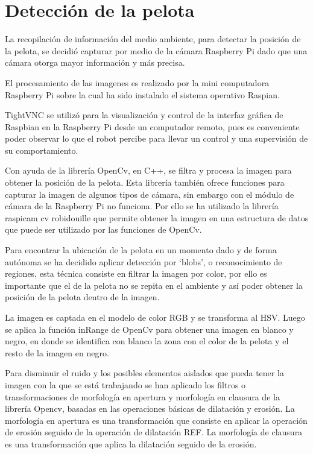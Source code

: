 \section{Detección de la pelota}\label{chapter:deteccion}


La recopilación de información del medio ambiente, para detectar la posición de la pelota, se decidió capturar por medio de la cámara Raspberry Pi dado que una cámara otorga mayor información y más precisa. 

El procesamiento de las imagenes es realizado por la mini computadora Raspberry Pi sobre la cual ha sido instalado el sistema operativo Raspian.

TightVNC se utilizó para la visualización y control de la interfaz gráfica de Raspbian en la Raspberry Pi desde un computador remoto, pues es conveniente poder observar lo que el robot percibe para llevar un control y una supervisión de su comportamiento.

Con ayuda de la librería OpenCv, en C++, se filtra y procesa la imagen para obtener la posición de la pelota. Esta librería también ofrece funciones para capturar la imagen de algunos tipos de cámara, sin embargo con el módulo de cámara de la Raspberry Pi no funciona. Por ello se ha utilizado la librería raspicam cv robidouille que permite obtener la imagen en una estructura de datos que puede ser utilizado por las funciones de OpenCv. 

Para encontrar la ubicación de la pelota en un momento dado y de forma autónoma se ha decidido aplicar detección por ‘blobs’, o reconocimiento de regiones, esta técnica consiste en filtrar la imagen por color, por ello es importante que el de la pelota no se repita en el ambiente y así poder obtener la posición de la pelota dentro de la imagen.

La imagen es captada en el modelo de color RGB y se transforma al HSV. Luego se aplica la función inRange de OpenCv para obtener una imagen en blanco y negro, en donde se identifica con blanco la zona con el color de la pelota y el resto de la imagen en negro. 

Para disminuir el ruido y los posibles elementos aislados que pueda tener la imagen con la que se está trabajando se han aplicado los filtros o transformaciones de morfología en apertura y morfología en clausura de la librería Opencv, basadas en las operaciones básicas de dilatación y erosión. La morfología en apertura es una transformación que consiste en aplicar la operación de erosión seguido de la operación de dilatación REF. La morfología de clausura es una transformación que aplica la dilatación seguido de la erosión.

